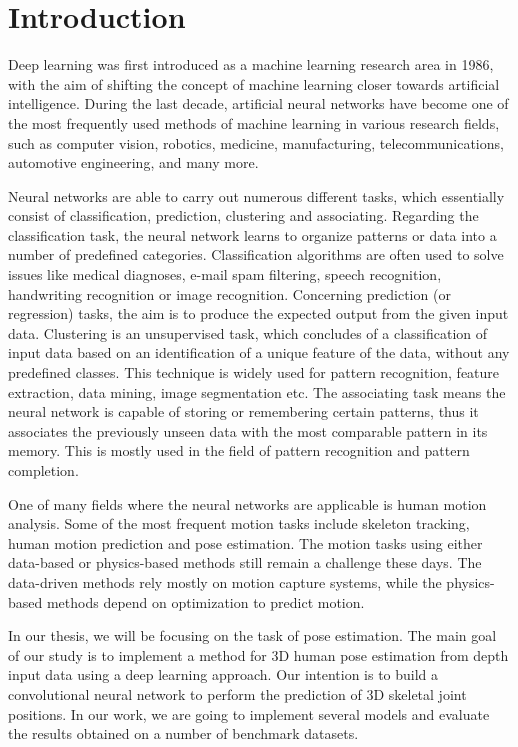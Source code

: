 \chapter{Introduction}\label{chap:intro}

Deep learning was first introduced as a machine learning research area in 1986, with the aim of shifting the concept of machine learning closer towards artificial intelligence. During the last decade, artificial neural networks have become one of the most frequently used methods of machine learning in various research fields, such as computer vision, robotics, medicine, manufacturing, telecommunications, automotive engineering, and many more.\par
\vspace{5mm}
\noindent Neural networks are able to carry out numerous different tasks, which essentially consist of classification, prediction, clustering and associating. Regarding the classification task, the neural network learns to organize patterns or data into a number of predefined categories. Classification algorithms are often used to solve issues like medical diagnoses, e-mail spam filtering, speech recognition, handwriting recognition or image recognition. Concerning prediction (or regression) tasks, the aim is to produce the expected output from the given input data. Clustering is an unsupervised task, which concludes of a classification of input data based on an identification of a unique feature of the data, without any predefined classes. This technique is widely used for pattern recognition, feature extraction, data mining, image segmentation etc. The associating task means the neural network is capable of storing or remembering certain patterns, thus it associates the previously unseen data with the most comparable pattern in its memory. This is mostly used in the field of pattern recognition and pattern completion.\par
\vspace{5mm}
\noindent One of many fields where the neural networks are applicable is human motion analysis. Some of the most frequent motion tasks include skeleton tracking, human motion prediction and pose estimation. The motion tasks using either data-based or physics-based methods still remain a challenge these days. The data-driven methods rely mostly on motion capture systems, while the physics-based methods depend on optimization to predict motion.
\par
\vspace{5mm}
\noindent 
In our thesis, we will be focusing on the task of pose estimation. The main goal of our study is to implement a method for 3D human pose estimation from depth input data using a deep learning approach. Our intention is to build a convolutional neural network to perform the prediction of 3D skeletal joint positions. In our work, we are going to implement several models and evaluate the results obtained on a number of benchmark datasets.\par
